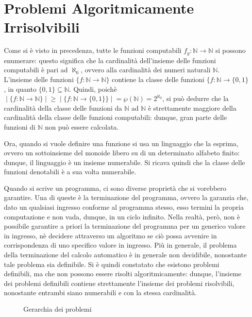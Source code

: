   \section{Problemi Algoritmicamente Irrisolvibili}
  Come si è visto in precedenza, tutte le funzioni computabili \(f_y:\mathbb{N}\to\mathbb{N}\) si possono enumerare: questo significa che la cardinalità dell'insieme delle funzioni computabili è pari ad \(\aleph_0\), ovvero alla cardinalità dei numeri naturali \(\mathbb{N}\). L'insieme delle funzioni \(\{f:\mathbb{N}\to\mathbb{N}\}\) contiene la classe delle funzioni \(\{f:\mathbb{N}\to\{0,1\}\), in quanto \(\{0,1\}\subseteq \mathbb{N}\). Quindi, poichè \(\;|\;\{f:\mathbb{N}\to\mathbb{N}\}\;|\; \ge \;|\;\{f:\mathbb{N}\to\{0,1\}\}\;|\; = \wp (\mathbb{N}) = 2^{\aleph_0}\), si può dedurre che la cardinalità della classe delle funzioni da \(\mathbb{N}\) ad \(\mathbb{N}\) è strettamente maggiore della cardinalità della classe delle funzioni computabili: dunque, gran parte delle funzioni di \(\mathbb{N}\) non può essere calcolata. 

  Ora, quando si vuole definire una funzione si usa un linguaggio che la esprima, ovvero un sottoinsieme del monoide libero su di un determinato alfabeto finito: dunque, il linguaggio è un insieme numerabile. Si ricava quindi che la classe delle funzioni denotabili è a sua volta numerabile.

  Quando si scrive un programma, ci sono diverse proprietà che si vorebbero garantire. Una di queste è la terminazione del programma, ovvero la garanzia che, dato un qualsiasi ingresso conforme al programma stesso, esso termini la propria computazione e non vada, dunque, in un ciclo infinito. Nella realtà, però, non è possibile garantire a priori la terminazione del programma per un generico valore in ingresso, nè decidere attraverso un algoritmo se ciò possa avvenire in corrispondenza di uno specifico valore in ingresso. Più in generale, il problema della terminazione del calcolo automatico è in generale non decidibile, nonostante tale problema sia definibile.
  Si è quindi constatato che esistono problemi definibili, ma che non possono essere risolti algoritmicamente: dunque, l'insieme dei problemi definibili contiene strettamente l'insieme dei problemi risolvibili, nonostante entrambi siano numerabili e con la stessa cardinalità.

  \begin{figure}[!h]
    \begin{center}    
    \end{center}
    \caption{Gerarchia dei problemi}    
  \end{figure}

